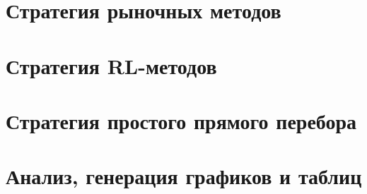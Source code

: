 \begingroup
\captiondelim{ } %

\endgroup

\newpage

\section{Стратегия рыночных методов}\label{app:code11}

\begingroup
\captiondelim{ } %

\endgroup

\newpage

\section{Стратегия RL-методов}\label{app:code12}

\begingroup
\captiondelim{ } %

\endgroup

\newpage

\section{Стратегия простого прямого перебора}\label{app:code13}

\begingroup
\captiondelim{ } %

\endgroup

\section{Анализ, генерация графиков и таблиц}\label{app:code14}

\begingroup
\captiondelim{ }

\endgroup